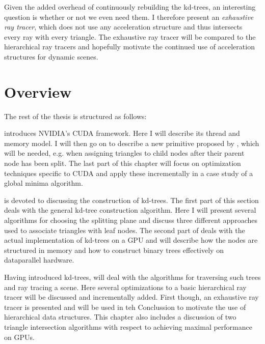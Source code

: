 Given the added overhead of continuously rebuilding the kd-trees, an interesting
question is whether or not we even need them. I therefore present an
\textit{exhaustive ray tracer}, which does not use any acceleration structure
and thus intersects every ray with every triangle. The exhaustive ray tracer
will be compared to the hierarchical ray tracers and hopefully motivate the
continued use of acceleration structures for dynamic scenes.

\section{Overview}

The rest of the thesis is structured as follows:




 introduces NVIDIA's CUDA framework. Here I will describe
its thread and memory model. I will then go on to describe a new primitive
proposed by \sengupta{}, which will be needed, e.g. when assigning triangles to
child nodes after their parent node has been split. The last part of this
chapter will focus on optimization techniques specific to CUDA and apply these
incrementally in a case study of a global minima algorithm.


 is devoted to discussing the construction of
kd-trees. The first part of this section deals with the general kd-tree
construction algorithm. Here I will present several algorithms for choosing the
splitting plane and discuss three different approaches used to associate
triangles with leaf nodes. The second part of  deals
with the actual implementation of kd-trees on a GPU and will describe how the
nodes are structured in memory and how to construct binary trees effectively on
dataparallel hardware.


Having introduced kd-trees,  will deal with the
algorithms for traversing such trees and ray tracing a scene. Here several
optimizations to a basic hierarchical ray tracer will be discussed and
incrementally added. First though, an exhaustive ray tracer is presented and
will be used in teh Conclussion to motivate the use of hierarchical data
structures. This chapter also includes a discussion of two triangle intersection
algorithms with respect to achieving maximal performance on GPUs.

